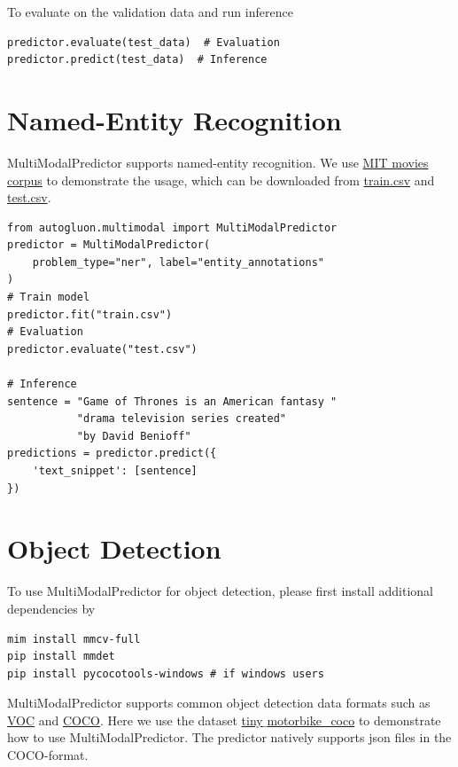 To evaluate on the validation data and run inference

\begin{verbatim}
predictor.evaluate(test_data)  # Evaluation
predictor.predict(test_data)  # Inference
\end{verbatim}

\section*{Named-Entity Recognition}
MultiModalPredictor supports named-entity recognition. We use \href{https://groups.csail.mit.edu/sls/downloads/movie/}{MIT movies corpus} to demonstrate the usage, which can be downloaded from \href{https://automl-mm-bench.s3.amazonaws.com/ner/mit-movies/train.csv}{train.csv} and \href{https://automl-mm-bench.s3.amazonaws.com/ner/mit-movies/test.csv}{test.csv}.

\begin{verbatim}
from autogluon.multimodal import MultiModalPredictor
predictor = MultiModalPredictor(
    problem_type="ner", label="entity_annotations"
)
# Train model
predictor.fit("train.csv")
# Evaluation
predictor.evaluate("test.csv")

# Inference
sentence = "Game of Thrones is an American fantasy "
           "drama television series created" 
           "by David Benioff"
predictions = predictor.predict({
    'text_snippet': [sentence]
})
\end{verbatim}

\section*{Object Detection}
To use MultiModalPredictor for object detection, please first install additional dependencies by
\begin{verbatim}
mim install mmcv-full
pip install mmdet
pip install pycocotools-windows # if windows users
\end{verbatim}

MultiModalPredictor supports common object detection data formats such as \href{http://host.robots.ox.ac.uk/pascal/VOC/}{VOC} and \href{https://cocodataset.org/}{COCO}. Here we use the dataset \href{https://automl-mm-bench.s3.amazonaws.com/object_detection_dataset/tiny_motorbike_coco.zip}{tiny$\_$motorbike\_coco} to demonstrate how to use MultiModalPredictor. The predictor natively supports json files in the COCO-format.

